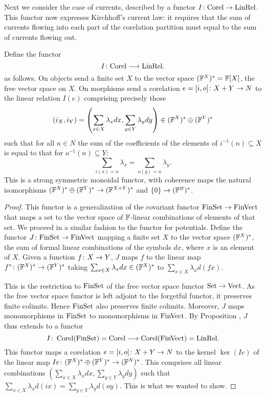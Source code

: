 Next we consider the case of currents, described by a functor $I{\colon}
\mathrm{Corel} \to \mathrm{LinRel}$. This functor now expresses Kirchhoff's
current law: it requires that the sum of currents flowing into each part of the
corelation partition must equal to the sum of currents flowing out.  
\begin{proposition}
  Define the functor
  \[
    I{\colon} \mathrm{Corel} \longrightarrow \mathrm{LinRel}.
  \]
  as follows. On objects send a finite set $X$ to the vector space
  $({\mathbb F}^{X})^\ast={\mathbb F}[X]$, the free vector space on $X$. On morphisms send a
  corelation $e=[i,o]{\colon} X +Y \to N$ to the linear relation $I(e)$ comprising precisely
  those 
  \[
    (i_X,i_Y) = \left(\sum_{x \in X} \lambda_xdx,\sum_{y \in Y}
    \lambda_ydy\right)  \in ({\mathbb F}^{X})^\ast \oplus ({\mathbb F}^{Y})^\ast
  \]
  such that for all $n \in N$ the sum of the coefficients of the elements
  of $i^{-1}(n) \subseteq X$ is equal to that for $o^{-1}(n) \subseteq Y$:
  \[
    \sum_{i(x)=n} \lambda_x = \sum_{o(y)=n} \lambda_y.
  \]
  This is a strong symmetric monoidal functor, with coherence maps the natural
  isomorphisms $({\mathbb F}^X)^\ast \oplus ({\mathbb F}^Y)^\ast \to ({\mathbb F}^{X+Y})^\ast$ and $\{0\}
  \to ({\mathbb F}^\varnothing)^\ast$.
\end{proposition}
\begin{proof}
  This functor is a generalization of the covariant functor $\mathrm{FinSet} \to
  \mathrm{FinVect}$ that maps a set to the vector space of ${\mathbb F}$-linear combinations of
  elements of that set. We proceed in a similar fashion to the functor for
  potentials. Define the functor $J{\colon} \mathrm{FinSet} \to \mathrm{FinVect}$ mapping a finite
  set $X$ to the vector space $({\mathbb F}^{X})^\ast$, the sum of formal linear
  combinations of the symbols $dx$, where $x$ is an element of $X$. Given a
  function $f{\colon} X \to Y$, $J$ maps $f$ to the linear map $f^\ast{\colon}
  ({\mathbb F}^X)^\ast \to ({\mathbb F}^Y)^\ast$ taking $\sum_{x \in X} \lambda_x dx \in
  ({\mathbb F}^X)^\ast$ to $\sum_{x \in X} \lambda_xd(fx)$.  

  This is the restriction to $\mathrm{FinSet}$ of the free vector space functor $\mathrm{Set}
  \to \mathrm{Vect}$. As the free vector space functor is left adjoint to the forgetful
  functor, it preserves finite colimits. Hence $\mathrm{FinSet}$ also preserves finite
  colimits. Moreover, $J$ maps monomorphisms in $\mathrm{FinSet}$ to monomorphisms in
  $\mathrm{FinVect}$. By Proposition , $J$ thus extends to a functor
  \[
    I{\colon} \operatorname{{Corel}}(\mathrm{FinSet}) = \mathrm{Corel} \longrightarrow \operatorname{{Corel}}(\mathrm{FinVect}) =
    \mathrm{LinRel}.
  \]
  This functor maps a corelation $e=[i,o]{\colon} X+Y \to N$ to the kernel
  $\ker(Ie)$ of the linear map $Ie{\colon} ({\mathbb F}^X)^\ast \oplus ({\mathbb F}^Y)^\ast \to
  ({\mathbb F}^N)^\ast$. This comprises all linear combinations $\left(\sum_{x \in X}
  \lambda_xdx,\sum_{y \in Y} \lambda_ydy\right)$ such that $\sum_{x \in X}
  \lambda_x d(ix) =  \sum_{y \in Y} \lambda_y d(oy)$. This is what we wanted to
  show.
\end{proof}


